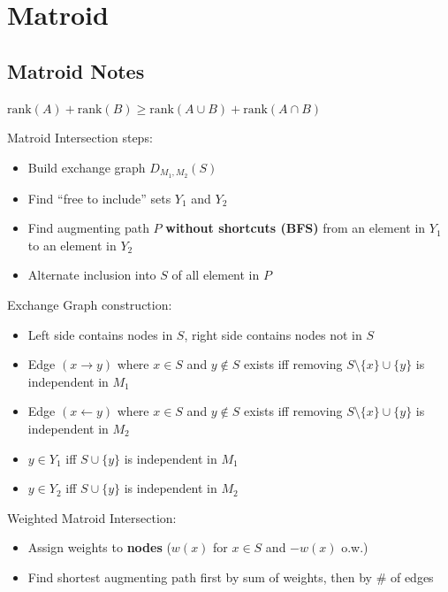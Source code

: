 \section{Matroid}

	\subsection{Matroid Notes}
    $\text{rank}(A) + \text{rank}(B) \geq \text{rank}(A \cup B) + \text{rank}(A \cap B)$

    Matroid Intersection steps:
    \begin{itemize}
     \setlength\itemsep{-1em}
     \item Build exchange graph $D_{M_1, M_2}(S)$
     \item Find ``free to include'' sets $Y_1$ and $Y_2$
     \item Find augmenting path $P$ \textbf{without shortcuts (BFS)} from an element in $Y_1$ to an element in $Y_2$
     \item Alternate inclusion into $S$ of all element in $P$
    \end{itemize}

    Exchange Graph construction:
    \begin{itemize}
     \setlength\itemsep{-1em}
     \item Left side contains nodes in $S$, right side contains nodes not in $S$
     \item Edge $(x \to y)$ where $x \in S$ and $y \notin S$ exists iff removing $S \setminus \{x\} \cup \{y\}$ is independent in $M_1$
     \item Edge $(x \gets y)$ where $x \in S$ and $y \notin S$ exists iff removing $S \setminus \{x\} \cup \{y\}$ is independent in $M_2$
     \item $y \in Y_1$ iff $S \cup \{y\}$ is independent in $M_1$
     \item $y \in Y_2$ iff $S \cup \{y\}$ is independent in $M_2$
    \end{itemize}

     Weighted Matroid Intersection:
    \begin{itemize}
     \setlength\itemsep{-1em}
      \item Assign weights to \textbf{nodes} ($w(x)$ for $x \in S$ and $-w(x)$ o.w.)
      \item Find shortest augmenting path first by sum of weights, then by \# of edges
    \end{itemize}

